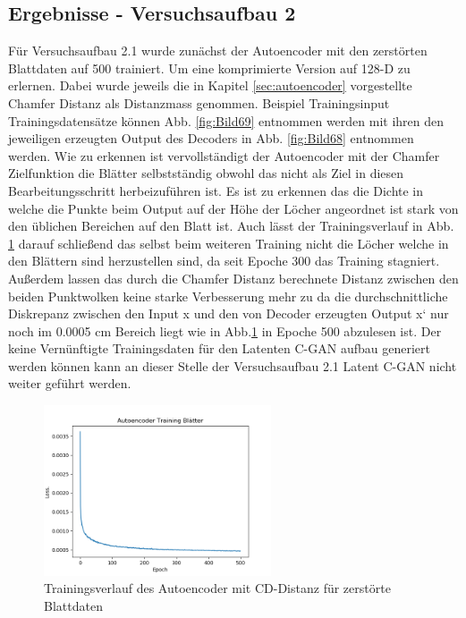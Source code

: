 \documentclass{llncs}
\begin{document}
\subsection{Ergebnisse - Versuchsaufbau 2}


Für Versuchsaufbau 2.1 wurde zunächst der Autoencoder mit den zerstörten Blattdaten auf 500 trainiert. Um eine komprimierte Version auf 128-D zu erlernen. Dabei wurde jeweils die in Kapitel \ref{sec:autoencoder} vorgestellte Chamfer Distanz als Distanzmass genommen. Beispiel Trainingsinput Trainingsdatensätze können  Abb. \ref{fig:Bild69} entnommen werden mit ihren den jeweiligen erzeugten Output des Decoders in Abb. \ref{fig:Bild68} entnommen werden. Wie zu erkennen ist vervollständigt der Autoencoder mit der Chamfer Zielfunktion die Blätter selbstständig obwohl das nicht als Ziel in diesen Bearbeitungsschritt herbeizuführen ist. Es ist zu erkennen das die Dichte in welche die Punkte beim Output auf der Höhe der Löcher angeordnet ist stark von den üblichen Bereichen auf den Blatt ist. Auch lässt der Trainingsverlauf in Abb. \ref{fig:Bild67} darauf schließend das selbst beim weiteren Training nicht die Löcher welche in den Blättern sind herzustellen sind, da seit Epoche 300 das Training stagniert. Außerdem lassen das durch die Chamfer Distanz berechnete Distanz zwischen den beiden Punktwolken keine starke Verbesserung mehr zu da die durchschnittliche Diskrepanz zwischen den Input x und den von Decoder erzeugten Output x` nur noch im 0.0005 cm Bereich liegt wie in Abb.\ref{fig:Bild67} in Epoche 500 abzulesen ist. Der keine Vernünftigte Trainingsdaten für den Latenten C-GAN aufbau generiert werden können kann an dieser Stelle der Versuchsaufbau 2.1 Latent C-GAN nicht weiter geführt werden. 

\begin{figure}[htbp] 
	\centering
	\includegraphics[width=0.6\textwidth]{autoencoder_training_blaetter_result.png}
	\caption{Trainingsverlauf des Autoencoder mit CD-Distanz für zerstörte Blattdaten}
	\label{fig:Bild67}
\end{figure}
\end{document}
